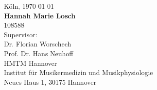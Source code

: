 \begin{titlepage}
\begin{addmargin}[\marginCoverPage]{0cm}
\vfill
\begin{center}
\begingroup
Köln, \monthyeardate\today \\
\addvspace{0.5cm}
\textbf{Hannah Marie Losch} \\
108588 \\
\addvspace{0.5cm}
Supervisor:\\
Dr. Florian Worschech \\
Prof. Dr. Hans Neuhoff\\
\addvspace{0.5cm}
HMTM Hannover \\
Institut für Musikermedizin und Musikphysiologie\\
Neues Haus 1, 30175 Hannover\\
\endgroup
\end{center}
\end{addmargin}
\end{titlepage}

